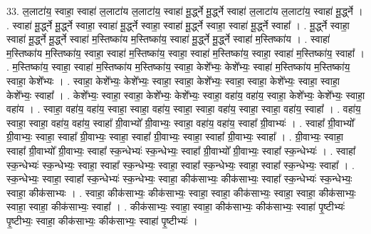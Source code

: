 \documentclass[17pt]{extarticle}
\begin{document}
33. ल॒लाटा॑य॒ स्वाहा॒ स्वाहा॑ ल॒लाटा॑य ल॒लाटा॑य॒ स्वाहा॑ मू॒र्द्ध्ने मू॒र्द्ध्ने स्वाहा॑ ल॒लाटा॑य ल॒लाटा॑य॒ स्वाहा॑ मू॒र्द्ध्ने । . स्वाहा॑ मू॒र्द्ध्ने मू॒र्द्ध्ने स्वाहा॒ स्वाहा॑ मू॒र्द्ध्ने स्वाहा॒ स्वाहा॑ मू॒र्द्ध्ने स्वाहा॒ स्वाहा॑ मू॒र्द्ध्ने स्वाहा᳚ । . मू॒र्द्ध्ने स्वाहा॒ स्वाहा॑ मू॒र्द्ध्ने मू॒र्द्ध्ने स्वाहा॑ म॒स्तिष्का॑य म॒स्तिष्का॑य॒ स्वाहा॑ मू॒र्द्ध्ने मू॒र्द्ध्ने स्वाहा॑ म॒स्तिष्का॑य । . स्वाहा॑ म॒स्तिष्का॑य म॒स्तिष्का॑य॒ स्वाहा॒ स्वाहा॑ म॒स्तिष्का॑य॒ स्वाहा॒ स्वाहा॑ म॒स्तिष्का॑य॒ स्वाहा॒ स्वाहा॑ म॒स्तिष्का॑य॒ स्वाहा᳚ । . म॒स्तिष्का॑य॒ स्वाहा॒ स्वाहा॑ म॒स्तिष्का॑य म॒स्तिष्का॑य॒ स्वाहा॒ केशे᳚भ्यः॒ केशे᳚भ्यः॒ स्वाहा॑ म॒स्तिष्का॑य म॒स्तिष्का॑य॒ स्वाहा॒ केशे᳚भ्यः । . स्वाहा॒ केशे᳚भ्यः॒ केशे᳚भ्यः॒ स्वाहा॒ स्वाहा॒ केशे᳚भ्यः॒ स्वाहा॒ स्वाहा॒ केशे᳚भ्यः॒ स्वाहा॒ स्वाहा॒ केशे᳚भ्यः॒ स्वाहा᳚ । . केशे᳚भ्यः॒ स्वाहा॒ स्वाहा॒ केशे᳚भ्यः॒ केशे᳚भ्यः॒ स्वाहा॒ वहा॑य॒ वहा॑य॒ स्वाहा॒ केशे᳚भ्यः॒ केशे᳚भ्यः॒ स्वाहा॒ वहा॑य । . स्वाहा॒ वहा॑य॒ वहा॑य॒ स्वाहा॒ स्वाहा॒ वहा॑य॒ स्वाहा॒ स्वाहा॒ वहा॑य॒ स्वाहा॒ स्वाहा॒ वहा॑य॒ स्वाहा᳚ । . वहा॑य॒ स्वाहा॒ स्वाहा॒ वहा॑य॒ वहा॑य॒ स्वाहा᳚ ग्री॒वाभ्यो᳚ ग्री॒वाभ्यः॒ स्वाहा॒ वहा॑य॒ वहा॑य॒ स्वाहा᳚ ग्री॒वाभ्यः॑ । . स्वाहा᳚ ग्री॒वाभ्यो᳚ ग्री॒वाभ्यः॒ स्वाहा॒ स्वाहा᳚ ग्री॒वाभ्यः॒ स्वाहा॒ स्वाहा᳚ ग्री॒वाभ्यः॒ स्वाहा॒ स्वाहा᳚ ग्री॒वाभ्यः॒ स्वाहा᳚ । . ग्री॒वाभ्यः॒ स्वाहा॒ स्वाहा᳚ ग्री॒वाभ्यो᳚ ग्री॒वाभ्यः॒ स्वाहा᳚ स्क॒न्धेभ्यः॑ स्क॒न्धेभ्यः॒ स्वाहा᳚ ग्री॒वाभ्यो᳚ ग्री॒वाभ्यः॒ स्वाहा᳚ स्क॒न्धेभ्यः॑ । . स्वाहा᳚ स्क॒न्धेभ्यः॑ स्क॒न्धेभ्यः॒ स्वाहा॒ स्वाहा᳚ स्क॒न्धेभ्यः॒ स्वाहा॒ स्वाहा᳚ स्क॒न्धेभ्यः॒ स्वाहा॒ स्वाहा᳚ स्क॒न्धेभ्यः॒ स्वाहा᳚ । . स्क॒न्धेभ्यः॒ स्वाहा॒ स्वाहा᳚ स्क॒न्धेभ्यः॑ स्क॒न्धेभ्यः॒ स्वाहा॒ कीक॑साभ्यः॒ कीक॑साभ्यः॒ स्वाहा᳚ स्क॒न्धेभ्यः॑ स्क॒न्धेभ्यः॒ स्वाहा॒ कीक॑साभ्यः । . स्वाहा॒ कीक॑साभ्यः॒ कीक॑साभ्यः॒ स्वाहा॒ स्वाहा॒ कीक॑साभ्यः॒ स्वाहा॒ स्वाहा॒ कीक॑साभ्यः॒ स्वाहा॒ स्वाहा॒ कीक॑साभ्यः॒ स्वाहा᳚ । . कीक॑साभ्यः॒ स्वाहा॒ स्वाहा॒ कीक॑साभ्यः॒ कीक॑साभ्यः॒ स्वाहा॑ पृ॒ष्टीभ्यः॑ पृ॒ष्टीभ्यः॒ स्वाहा॒ कीक॑साभ्यः॒ कीक॑साभ्यः॒ स्वाहा॑ पृ॒ष्टीभ्यः॑ । \newline
\end{document}
